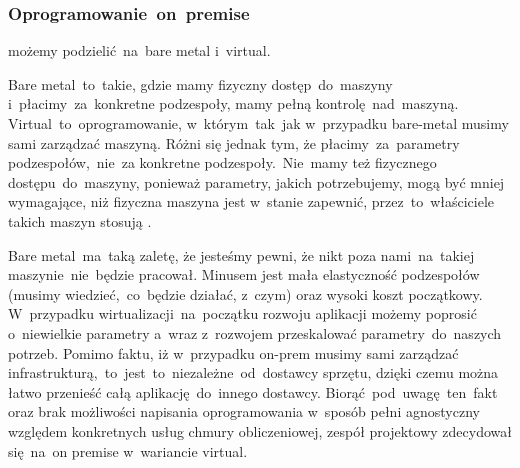 \subsubsection{Oprogramowanie~on~premise} możemy podzielić~na~bare metal i~virtual.

\indent Bare metal~to~takie, gdzie mamy fizyczny dostęp~do~maszyny i~płacimy~za~konkretne podzespoły, mamy pełną kontrolę~nad~maszyną.
Virtual~to~oprogramowanie, w~którym~tak~jak w~przypadku bare-metal musimy sami zarządzać maszyną.
Różni się jednak tym, że płacimy~za~parametry podzespołów,~nie~za konkretne podzespoły.~Nie~mamy też fizycznego dostępu~do~maszyny, ponieważ parametry, jakich potrzebujemy, mogą być mniej wymagające, niż fizyczna maszyna jest w~stanie zapewnić, przez~to~właściciele takich maszyn stosują .

\indent Bare metal~ma~taką zaletę, że jesteśmy pewni, że nikt poza nami~na~takiej maszynie~nie~będzie pracował.
Minusem jest mała elastyczność podzespołów (musimy wiedzieć,~co~będzie działać, z~czym) oraz wysoki koszt początkowy.
W~przypadku wirtualizacji~na~początku rozwoju aplikacji możemy poprosić o~niewielkie parametry a~wraz z~rozwojem przeskalować parametry~do~naszych potrzeb.
Pomimo faktu, iż w~przypadku \gls{on-prem} musimy sami zarządzać infrastrukturą,~to~jest~to~niezależne~od~dostawcy sprzętu, dzięki czemu można łatwo przenieść całą aplikację~do~innego dostawcy.
Biorąć~pod~uwagę~ten~fakt oraz brak możliwości napisania oprogramowania w~sposób pełni agnostyczny względem konkretnych usług chmury obliczeniowej, zespół projektowy zdecydował się~na~on premise w~wariancie virtual.

